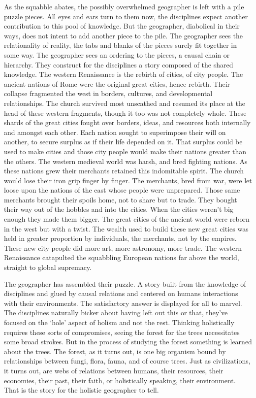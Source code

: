 \documentclass[a4paper, 12pt]{article}
\begin{document}
As the squabble abates, the possibly overwhelmed geographer is left with a pile puzzle pieces. All eyes and ears turn to them now, the disciplines expect another contribution to this pool of knowledge. But the geographer, diabolical in their ways, does not intent to add another piece to the pile. The geographer sees the relationality of reality, the tabs and blanks of the pieces surely fit together in some way. The geographer sees an ordering to the pieces, a causal chain or hierarchy. They construct for the disciplines a story composed of the shared knowledge. The western Renaissance is the rebirth of cities, of city people. The ancient nations of Rome were the original great cities, hence rebirth. Their collapse fragmented the west in borders, cultures,  and developmental relationships. The church survived most unscathed and resumed its place at the head of these western fragments, though it too was not completely whole. These shards of the great cities fought over borders, ideas, and resources both internally and amongst each other. Each nation sought to superimpose their will on another, to secure surplus as if their life depended on it. That surplus could be used to make cities and those city people would make their nations greater than the others. The western medieval world was harsh, and bred fighting nations. As these nations grew their merchants retained this indomitable spirit. The church would lose their iron grip finger by finger. The merchants, bred from war, were let loose upon the nations of the east whose people were unprepared. Those same merchants brought their spoils home, not to share but to trade. They bought their way out of the hobbles and into the cities. When the cities weren't big enough they made them bigger. The great cities of the ancient world were reborn in the west but with a twist. The wealth used to build these new great cities was held in greater proportion by individuals, the merchants, not by the empires. These new city people did more art, more astronomy, more trade. The western Renaissance catapulted the squabbling European nations far above the world, straight to global supremacy.

The geographer has assembled their puzzle. A story built from the knowledge of disciplines and glued by causal relations and centered on humans interactions with their environments. The satisfactory answer is displayed for all to marvel. The disciplines naturally bicker about having left out this or that, they've focused on the `hole' aspect of holism and not the rest. Thinking holistically requires these sorts of compromises, seeing the forest for the trees necessitates some broad strokes. But in the process of studying the forest something is learned about the trees. The forest, as it turns out, is one big organism bound by relationships between fungi, flora, fauna, and of course trees. Just as civilizations, it turns out, are webs of relations between humans, their resources, their economies, their past, their faith, or holistically speaking, their environment. That is the story for the holistic geographer to tell.
\end{document}
